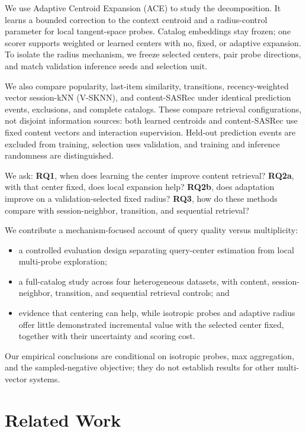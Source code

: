 \documentclass[runningheads]{llncs}
\newcommand{\method}{\textsc{ACE}}
\begin{document}
We use Adaptive Centroid Expansion (\method) to study the decomposition.
It learns a bounded correction to the context centroid and a radius-control
parameter for local tangent-space probes. Catalog embeddings stay frozen;
one scorer supports weighted or learned centers with no, fixed, or adaptive
expansion. To isolate the radius mechanism, we freeze selected centers, pair
probe directions, and match validation inference seeds and selection unit.

We also compare popularity, last-item similarity, transitions, recency-weighted
vector session-kNN (V-SKNN), and content-SASRec under identical prediction
events, exclusions, and complete catalogs. These compare retrieval
configurations, not disjoint information sources: both learned centroids and
content-SASRec use fixed content vectors and interaction supervision. Held-out
prediction events are excluded from training, selection uses validation, and
training and inference randomness are distinguished.

We ask: \textbf{RQ1}, when does learning the center improve content retrieval?
\textbf{RQ2a}, with that center fixed, does local expansion help?
\textbf{RQ2b}, does adaptation improve on a validation-selected fixed radius?
\textbf{RQ3}, how do these methods compare with session-neighbor, transition,
and sequential retrieval?

We contribute a mechanism-focused account of query quality versus multiplicity:
\begin{itemize}
  \item a controlled evaluation design separating query-center estimation
  from local multi-probe exploration;
  \item a full-catalog study across four heterogeneous datasets, with content,
  session-neighbor, transition, and sequential retrieval controls; and
  \item evidence that centering can help, while isotropic probes and adaptive
  radius offer little demonstrated incremental value with the selected center
  fixed, together with their uncertainty and scoring cost.
\end{itemize}
Our empirical conclusions are conditional on isotropic probes, max aggregation,
and the sampled-negative objective; they do not establish results for other
multi-vector systems.

\section{Related Work}
\label{sec:related}
\end{document}
